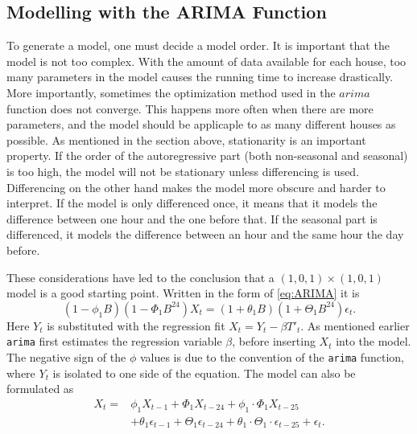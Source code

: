 \subsection{Modelling with the ARIMA Function}
To generate a model, one must decide a model order. It is important that the model is not too complex. With the amount of data available for each house, too many parameters in the model causes the running time to increase drastically. More importantly, sometimes the optimization method used in the $arima$ function does not converge. This happens more often when there are more parameters, and the model should be applicaple to as many different houses as possible. As mentioned in the section above, stationarity is an important property. If the order of the autoregressive part (both non-seasonal and seasonal) is too high, the model will not be stationary unless differencing is used. Differencing on the other hand makes the model more obscure and harder to interpret. If the model is only differenced once, it means that it models the difference between one hour and the one before that. If the seasonal part is differenced, it models the difference between an hour and the same hour the day before.

\noindent These considerations have led to the conclusion that a $(1,0,1)\times (1,0,1)$ model is a good starting point. Written in the form of \cref{eq:ARIMA} it is
\begin{equation}
    (1-\phi_1 B)(1-\Phi_1 B^{24})X_t = (1+\theta_1 B)(1+\Theta_1 B^{24}) \epsilon_t. \label{eq:model1}
\end{equation}
Here $Y_t$ is substituted with the regression fit $X_t = Y_t -\beta T'_t$. As mentioned earlier \texttt{arima} first estimates the regression variable $\beta$, before inserting $X_t$ into the model. The negative sign of the $\phi$ values is due to the convention of the \texttt{arima} function, where $Y_t$ is isolated to one side of the equation. The model can also be formulated as
\begin{align}
    X_t = &\phi_1 X_{t-1} + \Phi_1 X_{t-24} + \phi_1 \cdot \Phi_1  X_{t-25}\nonumber\\  &+ \theta_1 \epsilon_{t-1} + \Theta_1 \epsilon_{t-24} + \theta_1 \cdot \Theta_1 \cdot \epsilon_{t-25} + \epsilon_t.
\end{align}

